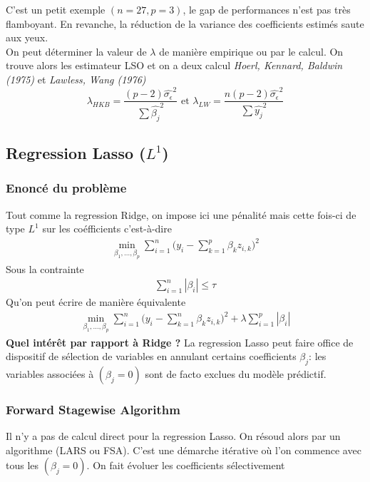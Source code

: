 \documentclass[a4paper]{article}
\begin{document}
C’est un petit exemple $(n = 27, p = 3)$, le gap de performances n’est pas très flamboyant. En revanche, la réduction de la variance des coefficients estimés saute aux yeux.
\\
On peut déterminer la valeur de $\lambda$ de manière empirique ou par le calcul. On trouve alors les estimateur LSO et on a deux calcul \textit{Hoerl, Kennard, Baldwin (1975)} et \textit{Lawless, Wang (1976)}
\begin{equation*}
    \lambda_{HKB} = \frac{(p-2)\hat{\sigma_\epsilon}^2}{\sum \hat{\beta_j} ^2} \text{  et  } \lambda_{LW} = \frac{n(p-2)\hat{\sigma_\epsilon}^2}{\sum \hat{y_j} ^2}
\end{equation*}
\subsection{Regression Lasso ($L^1$)}
\subsubsection{Enoncé du problème}
Tout comme la regression Ridge, on impose ici une pénalité mais cette fois-ci de type $L^1$ sur les coéfficients c'est-à-dire
\begin{align}
    \min_{\beta_1, \dots, \beta_p} \sum_{i=1}^{n} \bigg( y_i - \sum_{k=1}^{p} \beta_k z_{i,k} \bigg)^2
\end{align}
Sous la contrainte 
\begin{align*}
    \sum_{i=1}^{n} |\beta_i| \leq \tau
\end{align*}
Qu'on peut écrire de manière équivalente
\begin{align}
    \min_{\beta_1, \dots, \beta_p} \sum_{i=1}^{n} \bigg( y_i - \sum_{k=1}^{n} \beta_k z_{i,k} \bigg)^2 + \lambda \sum_{i=1}^{p} |\beta_i| 
\end{align}
\textbf{Quel intérêt par rapport à Ridge ?} La regression Lasso peut faire office de dispositif de
sélection de variables en annulant certains coefficients $\beta_j$: les variables associées
à $(\beta_j = 0)$ sont de facto exclues du modèle prédictif.
\subsubsection{Forward Stagewise Algorithm}
Il n’y a pas de calcul direct pour la regression Lasso. On résoud alors par un algorithme (LARS ou FSA). C’est une démarche itérative où l’on commence avec tous les $(\beta_j = 0)$. On fait évoluer les coefficients sélectivement
\end{document}
